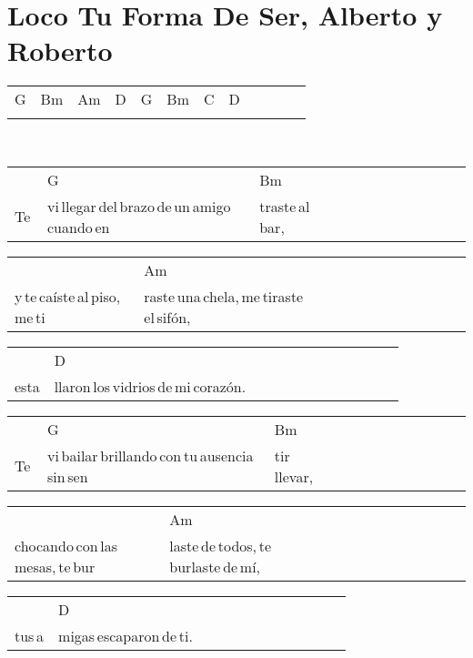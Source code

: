 \section*{Loco Tu Forma De Ser, Alberto y Roberto\hfill}
\begin{multicols}{2}
\noindent
\begin{minipage}{\columnwidth}
\noindent
\noindent
\begin{tabular}{llllllllllll}
G&Bm&Am&D&G&Bm&C&D\\
\quad\quad\quad&\quad\quad\quad\quad&\quad\quad\quad\quad&\quad\quad\quad&\quad\quad\quad&\quad\quad\quad\quad&\quad\quad\quad&
\end{tabular}
\end{minipage}\\

\noindent
\begin{minipage}{\columnwidth}
\noindent
\noindent
\begin{tabular}{llllllllllll}
&G&Bm\\
Te\,&vi\,llegar\,del\,brazo\,de\,un\,amigo\,cuando\,en&traste\,al\,bar,
\end{tabular}

\noindent
\begin{tabular}{llllllllllll}
&Am\\
y\,te\,caíste\,al\,piso,\,me\,ti&raste\,una\,chela,\,me\,tiraste\,el\,sifón,
\end{tabular}

\noindent
\begin{tabular}{llllllllllll}
&D\\
esta&llaron\,los\,vidrios\,de\,mi\,corazón.
\end{tabular}

\noindent
\begin{tabular}{llllllllllll}
&G&Bm\\
Te\,&vi\,bailar\,brillando\,con\,tu\,ausencia\,sin\,sen&tir\,llevar,
\end{tabular}

\noindent
\begin{tabular}{llllllllllll}
&Am\\
chocando\,con\,las\,mesas,\,te\,bur&laste\,de\,todos,\,te\,burlaste\,de\,mí,
\end{tabular}

\noindent
\begin{tabular}{llllllllllll}
&D\\
tus\,a&migas\,escaparon\,de\,ti.
\end{tabular}
\end{minipage}\\


\end{multicols}
